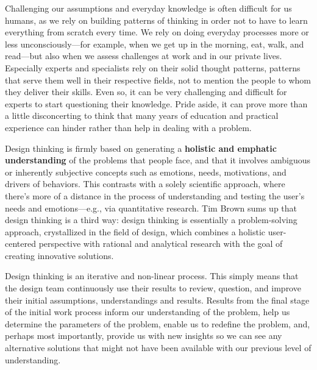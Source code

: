 Challenging our assumptions and everyday knowledge is often difficult for us humans, as we rely on building patterns of thinking in order not to have to learn everything from scratch every time. We rely on doing everyday processes more or less unconsciously---for example, when we get up in the morning, eat, walk, and read---but also when we assess challenges at work and in our private lives. Especially experts and specialists rely on their solid thought patterns, patterns that serve them well in their respective fields, not to mention the people to whom they deliver their skills. Even so, it can be very challenging and difficult for experts to start questioning their knowledge. Pride aside, it can prove more than a little disconcerting to think that many years of education and practical experience can hinder rather than help in dealing with a problem.


Design thinking is firmly based on generating a \textbf{holistic and emphatic understanding} of the problems that people face, and that it involves ambiguous or inherently subjective concepts such as emotions, needs, motivations, and drivers of behaviors.
This contrasts with a solely scientific approach, where there’s more of a distance in the process of understanding and testing the user’s needs and emotions---e.g., via quantitative research. Tim Brown sums up that design thinking is a third way: design thinking is essentially a problem-solving approach, crystallized in the field of design, which combines a holistic user-centered perspective with rational and analytical research with the goal of creating innovative solutions.

Design thinking is an iterative and non-linear process. This simply means that the design team continuously use their results to review, question, and improve their initial assumptions, understandings and results. Results from the final stage of the initial work process inform our understanding of the problem, help us determine the parameters of the problem, enable us to redefine the problem, and, perhaps most importantly, provide us with new insights so we can see any alternative solutions that might not have been available with our previous level of understanding.

